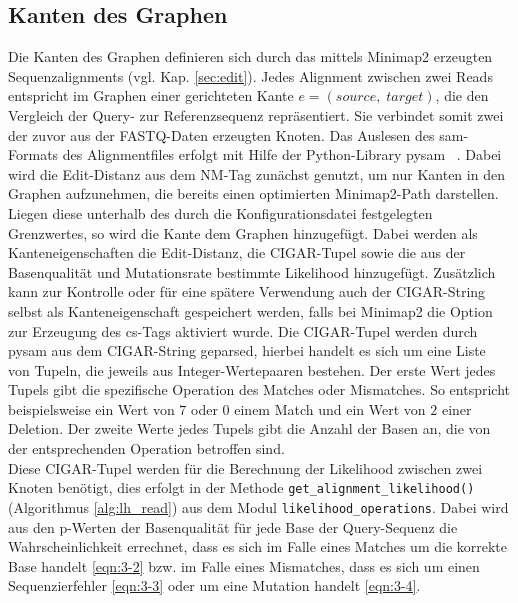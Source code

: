\subsection{Kanten des Graphen} \label{subsec:edges}
Die Kanten des Graphen definieren sich durch das mittels Minimap2 erzeugten Sequenzalignments (vgl. Kap. \ref{sec:edit}). Jedes Alignment zwischen zwei Reads entspricht im Graphen einer gerichteten Kante $e = (source,\; target)$, die den Vergleich der Query- zur Referenzsequenz repräsentiert. Sie verbindet somit zwei der zuvor aus der FASTQ-Daten erzeugten Knoten. Das Auslesen des sam-Formats des Alignmentfiles erfolgt mit Hilfe der Python-Library pysam ~\cite{pysam}. Dabei wird die Edit-Distanz aus dem NM-Tag zunächst genutzt, um nur Kanten in den Graphen aufzunehmen, die bereits einen optimierten Minimap2-Path darstellen. Liegen diese unterhalb des durch die Konfigurationsdatei festgelegten Grenzwertes, so wird die Kante dem Graphen hinzugefügt. Dabei werden als Kanteneigenschaften die Edit-Distanz, die CIGAR-Tupel sowie die aus der Basenqualität und Mutationsrate bestimmte Likelihood hinzugefügt. Zusätzlich kann zur Kontrolle oder für eine spätere Verwendung auch der CIGAR-String selbst als Kanteneigenschaft gespeichert werden, falls bei Minimap2 die Option zur Erzeugung des cs-Tags aktiviert wurde. Die CIGAR-Tupel werden durch pysam aus dem CIGAR-String geparsed, hierbei handelt es sich um eine Liste von Tupeln, die jeweils aus Integer-Wertepaaren bestehen. Der erste Wert jedes Tupels gibt die spezifische Operation des Matches oder Mismatches. So entspricht beispielsweise ein Wert von $ 7 $ oder $ 0 $ einem Match und ein Wert von $ 2 $ einer Deletion. Der zweite Werte jedes Tupels gibt die Anzahl der Basen an, die von der entsprechenden Operation betroffen sind. \\

Diese CIGAR-Tupel werden für die Berechnung der Likelihood zwischen zwei Knoten benötigt, dies erfolgt in der Methode \lstinline|get_alignment_likelihood()| (Algorithmus \ref{alg:lh_read}) aus dem Modul \lstinline|likelihood_operations|. Dabei wird aus den p-Werten der Basenqualität für jede Base der Query-Sequenz die Wahrscheinlichkeit errechnet, dass es sich im Falle eines Matches um die korrekte Base handelt  \eqref{eqn:3-2} bzw. im Falle eines Mismatches, dass es sich um einen Sequenzierfehler \eqref{eqn:3-3} oder um eine Mutation handelt \eqref{eqn:3-4}. \\

